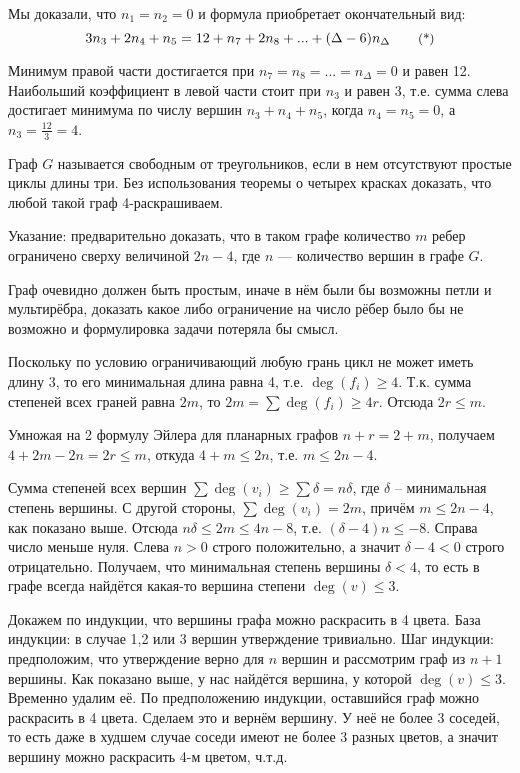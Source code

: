\documentclass[a4paper,12pt]{article}
\numberwithin{figure}{section}
\begin{document}
\begin{solution}
	Мы доказали, что $n_1=n_2=0$ и формула приобретает окончательный вид:
	\[ 3n_3+2n_4+n_5 = 12+n_7+2n_8+...+(\Delta-6)n_{\Delta}
	   \qquad\text{\small(*)} \]

	Минимум правой части достигается при $n_7=n_8=...=n_{\Delta}=0$ и равен 12. Наибольший коэффициент в левой части стоит при $n_3$ и равен 3, т.е. сумма слева достигает минимума по числу вершин $n_3+n_4+n_5$, когда $n_4=n_5=0$, а $n_3=\frac{12}{3}=4$.
\end{solution}


\begin{problem}
	Граф $G$ называется свободным от треугольников, если в нем отсутствуют простые циклы длины три. Без использования теоремы о четырех красках доказать, что любой такой граф 4-раскрашиваем.

	Указание: предварительно доказать, что в таком графе количество $m$ ребер ограничено сверху величиной $2n-4$, где $n$ --- количество вершин в графе $G$. 
\end{problem}
\begin{solution}
	Граф очевидно должен быть простым, иначе в нём были бы возможны петли и мультирёбра, доказать какое либо ограничение на число рёбер было бы не возможно и формулировка задачи потеряла бы смысл.
		
	Поскольку по условию ограничивающий любую грань цикл не может иметь длину 3, то его минимальная длина равна 4, т.е. $\deg(f_i) \geqslant 4$. Т.к. сумма степеней всех граней равна $2m$, то $2m = \sum{\deg(f_i)} \geqslant 4r$. Отсюда $2r \leqslant m$.
	
	Умножая на 2 формулу Эйлера для планарных графов $n+r=2+m$, получаем $4+2m-2n=2r \leqslant m$, откуда $4+m \leqslant 2n$, т.е. $m \leqslant 2n-4$.
	
	Сумма степеней всех вершин $\sum \deg(v_i) \geqslant \sum \delta = n\delta$, где $\delta$ -- минимальная степень вершины. С другой стороны, $\sum \deg(v_i) = 2m$, причём $m \leqslant 2n-4$, как показано выше. Отсюда $n\delta \leqslant 2m \leqslant 4n-8$, т.е. $(\delta - 4)n \leqslant -8$. Справа число меньше нуля. Слева $n>0$ строго положительно, а значит $\delta-4<0$ строго отрицательно. Получаем, что минимальная степень вершины $\delta < 4$, то есть в графе всегда найдётся какая-то вершина степени $\deg(v) \leqslant 3$.
	
	Докажем по индукции, что вершины графа можно раскрасить в 4 цвета. База индукции: в случае 1,2 или 3 вершин утверждение тривиально. Шаг индукции: предположим, что утверждение верно для $n$ вершин и рассмотрим граф из $n+1$ вершины. Как показано выше, у нас найдётся вершина, у которой $\deg(v) \leqslant 3$. Временно удалим её. По предположению индукции, оставшийся граф можно раскрасить в 4 цвета. Сделаем это и вернём вершину. У неё не более 3 соседей, то есть даже в худшем случае соседи имеют не более 3 разных цветов, а значит вершину можно раскрасить 4-м цветом, ч.т.д.
\end{solution}
\end{document}
